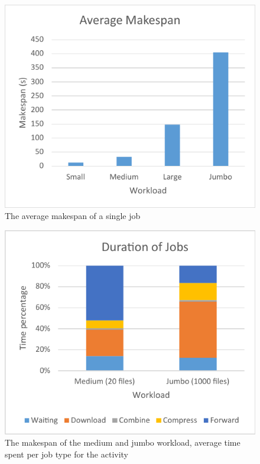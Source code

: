 \documentclass[twocolumn,twoside]{IEEEtran}
\begin{document}
\begin{figure}[h]
\begin{center}
 \includegraphics[trim=0 0 0 0,keepaspectratio=true,scale=0.8]{makespan}
\caption{The average makespan of a single job}
\label{fig:makespans}
\end{center}
\end{figure}

\begin{figure}[h]
\begin{center}
 \includegraphics[trim=0 0 0 0,keepaspectratio=true,scale=0.8]{jobdurations}
\caption{The makespan of the medium and jumbo workload, average time spent per job type for the activity}
\label{fig:makespanexpl}
\end{center}
\end{figure}
\end{document}
